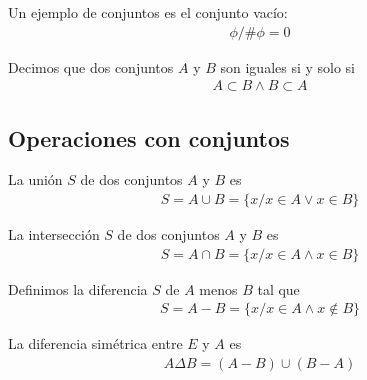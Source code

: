 \documentclass{article}
\begin{document}
Un ejemplo de conjuntos es el conjunto vacío:
\begin{equation}
	\begin{split}
		\phi / \# \phi = 0
	\end{split}
\end{equation}
\begin{defin}
	Decimos que dos conjuntos $A$ y $B$ son iguales si y solo si
	\begin{equation}
		\begin{split}
			A \subset B \wedge B \subset A
		\end{split}
	\end{equation}
\end{defin}
\subsection{Operaciones con conjuntos}
\begin{defin}
	La unión $S$ de dos conjuntos $A$ y $B$ es
	\begin{equation}
		\begin{split}
			S = A \cup B = \{x / x \in A \vee x \in B \}
		\end{split}
	\end{equation}
\end{defin}
\begin{defin}
	La intersección $S$ de dos conjuntos $A$ y $B$ es
	\begin{equation}
		\begin{split}
			S = A \cap B = \{ x / x \in A \wedge x \in B \}
		\end{split}
	\end{equation}
\end{defin}
\begin{defin}
	Definimos la diferencia $S$ de $A$ menos $B$ tal que
	\begin{equation}
		\begin{split}
			S = A - B = \{ x / x \in A \wedge x \notin B  \}
		\end{split}
	\end{equation}
\end{defin}
\begin{defin}
	La diferencia simétrica entre $E$ y $A$ es
	\begin{equation}
		\begin{split}
			A \Delta B = (A-B)\cup (B-A)
		\end{split}
	\end{equation}
\end{defin}
\end{document}
